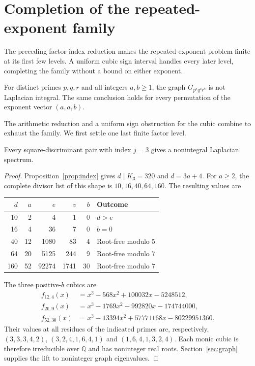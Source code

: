 \section{Completion of the repeated-exponent family}
\label{sec:completion}

The preceding factor-index reduction makes the repeated-exponent problem
finite at its first few levels. A uniform cubic sign interval handles every
later level, completing the family without a bound on either exponent.

\begin{theorem}
\label{thm:repeated}
For distinct primes $p,q,r$ and all integers $a,b\geq1$, the graph
$G_{p^a q^a r^b}$ is not Laplacian integral. The same conclusion holds
for every permutation of the exponent vector $(a,a,b)$.
\end{theorem}

The arithmetic reduction and a uniform sign obstruction for the cubic
combine to exhaust the family. We first settle one last finite factor level.

\begin{lemma}
\label{lem:third-index}
Every square-discriminant pair with index $j=3$ gives a nonintegral
Laplacian spectrum.
\end{lemma}
\begin{proof}
Proposition~\ref{prop:index} gives $d\mid K_3=320$ and $d=3a+4$.
For $a\geq2$, the complete divisor list of this shape is
$10,16,40,64,160$. The resulting values are
\begin{center}
\begin{tabular}{rrrrrl}
\toprule
$d$ & $a$ & $e$ & $v$ & $b$ & Outcome\\
\midrule
10 & 2 & 4 & 1 & 0 & $d>e$\\
16 & 4 & 36 & 7 & 0 & $b=0$\\
40 & 12 & 1080 & 83 & 4 & Root-free modulo $5$\\
64 & 20 & 5125 & 244 & 9 & Root-free modulo $7$\\
160 & 52 & 92274 & 1741 & 30 & Root-free modulo $7$\\
\bottomrule
\end{tabular}
\end{center}
The three positive-$b$ cubics are
\begin{align*}
f_{12,4}(x)&=x^3-568x^2+100032x-5248512,\\
f_{20,9}(x)&=x^3-1769x^2+992820x-174744000,\\
f_{52,30}(x)&=x^3-13394x^2+57771168x-80229951360.
\end{align*}
Their values at all residues of the indicated primes are, respectively,
$(3,3,3,4,2)$, $(3,2,4,1,6,4,1)$ and $(1,6,4,1,3,2,4)$.
Each monic cubic is therefore irreducible over $\mathbb Q$ and has
noninteger real roots. Section~\ref{sec:graph} supplies the lift to
noninteger graph eigenvalues.
\end{proof}

